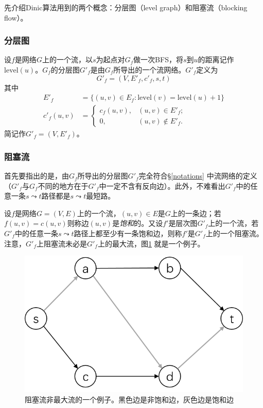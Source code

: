 \documentclass{ctexbook}
\begin{document}
  先介绍Dinic算法用到的两个概念：分层图（level graph）和阻塞流（blocking flow）。
  \subsubsection*{分层图}
  设$f$是网络$G$上的一个流，以$s$为起点对$G_f$做一次BFS，将$s$到$u$的距离记作$\mathrm{level}(u)$。$G_f$的分层图$G'_f$是由$G_f$所导出的一个流网络。$G'_f$定义为
  \[
  G'_f =(V, E'_f, c'_f, s, t)
  \]
  其中
  \begin{align*}
      E'_f &= \{(u,v)\in E_f\colon \mathrm{level}(v) = \mathrm{level}(u)+1\} \\
      c'_f(u,v) &=\begin{cases}
      c_f(u,v), & (u,v)\in E'_f;\\
      0, & (u,v)\notin E'_f.\end{cases}
  \end{align*}
  简记作$G'_f =(V, E'_f)$。
  \subsubsection{阻塞流}
  首先要指出的是，由$G_f$所导出的分层图$G'_f$完全符合\S\ref{notations} 中流网络的定义（$G'_f$与$G_f$不同的地方在于$G'_f$中一定不含有反向边）。此外，不难看出$G'_f$中的任意一条$s\leadsto t$路径都是$s\leadsto t$最短路。

  设$f$是网络$G=(V,E)$上的一个流，$(u,v)\in E$是$G$上的一条边；若$f(u,v) = c(u,v)$则称边$(u,v)$是\emph{饱和}的。又设$f'$是层次图$G'_f$上的一个流，若$G'_f$中的任意一条$s\leadsto t$路径上都至少有一条饱和边，则称$f'$是$G'_f$上的一个阻塞流。注意，$G'_f$上阻塞流未必是$G'_f$上的最大流，图\ref{Fig:blocking-flow} 就是一个例子。
  \begin{figure}
      \centering
      \includegraphics[scale=0.5]{figures/blocking-flow.png}
      \caption{阻塞流非最大流的一个例子。黑色边是非饱和边，灰色边是饱和边}
      \label{Fig:blocking-flow}
  \end{figure}
\end{document}

